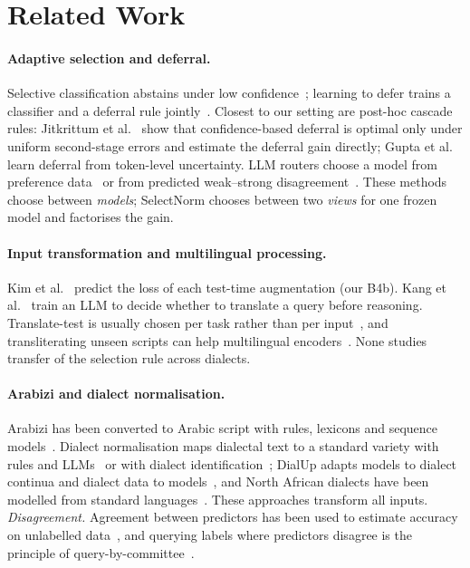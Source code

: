 \section{Related Work}
\label{sec:related}

\paragraph{Adaptive selection and deferral.}
Selective classification abstains under low confidence~\cite{geifman2017selective,geifman2019selectivenet}; learning to defer trains a classifier and a deferral rule jointly~\cite{mozannar2020defer}. Closest to our setting are post-hoc cascade rules: Jitkrittum et al.~\cite{jitkrittum2023cascade} show that confidence-based deferral is optimal only under uniform second-stage errors and estimate the deferral gain directly; Gupta et al.~\cite{gupta2024cascades} learn deferral from token-level uncertainty. LLM routers choose a model from preference data~\cite{ong2025routellm} or from predicted weak--strong disagreement~\cite{noorani2026disagreement}. These methods choose between \emph{models}; SelectNorm chooses between two \emph{views} for one frozen model and factorises the gain.

\paragraph{Input transformation and multilingual processing.}
Kim et al.~\cite{kim2020learningloss} predict the loss of each test-time augmentation (our B4b). Kang et al.~\cite{kang2026luar} train an LLM to decide whether to translate a query before reasoning. Translate-test is usually chosen per task rather than per input~\cite{artetxe2023revisiting}, and transliterating unseen scripts can help multilingual encoders~\cite{muller2021unseen,moosa2023transliteration}. None studies transfer of the selection rule across dialects.

\paragraph{Arabizi and dialect normalisation.}
Arabizi has been converted to Arabic script with rules, lexicons and sequence models~\cite{darwish2014arabizi,shazal2020unified}. Dialect normalisation maps dialectal text to a standard variety with rules and LLMs~\cite{dimakis2025dialect} or with dialect identification~\cite{alhafni2024exploiting}; DialUp adapts models to dialect continua and dialect data to models~\cite{bafna2025dialup}, and North African dialects have been modelled from standard languages~\cite{toughrai2025modeling}. These approaches transform all inputs.
\emph{Disagreement.} Agreement between predictors has been used to estimate accuracy on unlabelled data~\cite{platanios2014estimating,garg2022atc}, and querying labels where predictors disagree is the principle of query-by-committee~\cite{seung1992qbc}.
